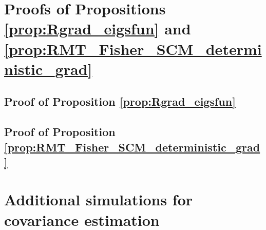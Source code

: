 \section{Proofs of Propositions \ref{prop:Rgrad_eigsfun} and \ref{prop:RMT_Fisher_SCM_deterministic_grad}}
\label{app:proofs}

\subsection{Proof of Proposition \ref{prop:Rgrad_eigsfun}}

\subsection{Proof of Proposition \ref{prop:RMT_Fisher_SCM_deterministic_grad}}


\section{Additional simulations for covariance estimation}
\label{app:simu_RMTCov}